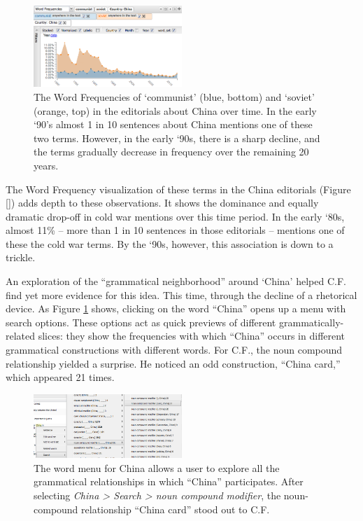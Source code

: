 \documentclass{sig-alternate}
\begin{document}
\begin{figure}[h!]
\includegraphics[width=0.5\textwidth]{fig/chris/04b.png}
\caption{The Word Frequencies of `communist' (blue, bottom) and `soviet' (orange, top) in the editorials about China over time. In the early `90's almost 1 in 10 sentences about China mentions one of these two terms. However, in the early `90s, there is a sharp decline, and the terms gradually decrease in frequency over the remaining 20 years. }
\end{figure}

The Word Frequency visualization of these terms in the China editorials (Figure \ref{}) adds depth to these observations.  It shows the dominance and equally dramatic drop-off in cold war mentions over this time period. In the early `80s, almost 11\% -- more than 1 in 10 sentences in those editorials -- mentions one of these the cold war terms. By the `90s, however, this association is down to a trickle. 

An exploration of the ``grammatical neighborhood'' around `China'  helped C.F. find yet more evidence for this idea. This time, through the decline of a rhetorical device. As Figure \ref{fig:chris01} shows, clicking on the word ``China'' opens up a menu with search options. These options act as quick previews of different grammatically-related slices: they show the frequencies with which ``China'' occurs in different grammatical constructions with different words.  For C.F., the noun compound relationship yielded a surprise. He noticed an odd construction, ``China card,'' which appeared 21 times.

\begin{figure}[h!]
\includegraphics[width=0.5\textwidth]{fig/chris/01.png}
\caption{The word menu for China allows a user to explore all the grammatical relationships in which ``China'' participates.   After selecting \emph{China > Search > noun compound modifier}, the noun-compound relationship ``China card'' stood out to C.F. \label{fig:chris01}}
\end{figure}
\end{document}
